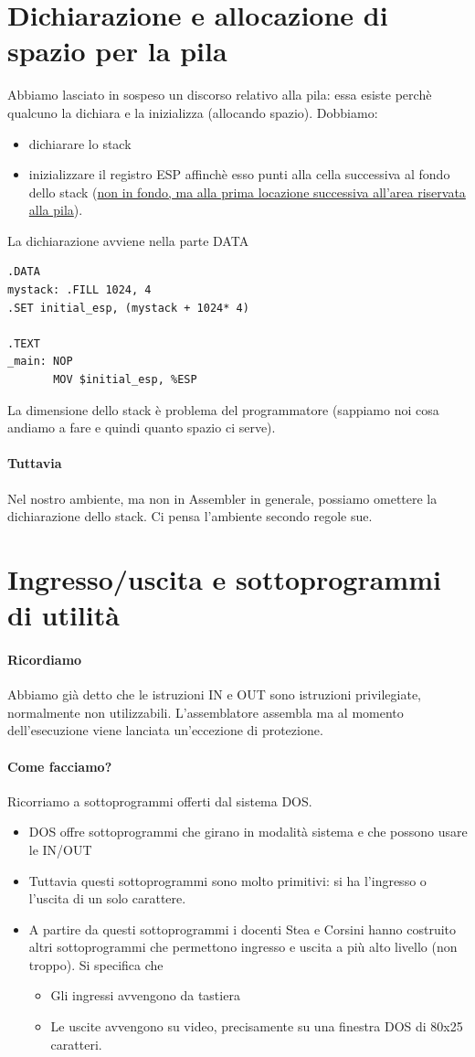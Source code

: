 \documentclass[11pt]{report}
\begin{document}
\section{Dichiarazione e allocazione di spazio per la pila}
Abbiamo lasciato in sospeso un discorso relativo alla pila: essa esiste perchè qualcuno la dichiara e la inizializza (allocando spazio). Dobbiamo:
\begin{itemize}
\item dichiarare lo stack
\item inizializzare il registro ESP affinchè esso punti alla cella successiva al fondo dello stack (\underline{non in fondo, ma alla prima locazione successiva all'area riservata alla pila}). 
\end{itemize}
La dichiarazione avviene nella parte DATA
\begin{verbatim}
.DATA
mystack: .FILL 1024, 4
.SET initial_esp, (mystack + 1024* 4)

.TEXT
_main: NOP
       MOV $initial_esp, %ESP
\end{verbatim}
La dimensione dello stack è problema del programmatore (sappiamo noi cosa andiamo a fare e quindi quanto spazio ci serve).
\paragraph{Tuttavia} Nel nostro ambiente, ma non in Assembler in generale, possiamo omettere la dichiarazione dello stack. Ci pensa l'ambiente secondo regole sue.
\clearpage

\section{Ingresso/uscita e sottoprogrammi di utilità}
\paragraph{Ricordiamo} Abbiamo già detto che le istruzioni IN e OUT sono istruzioni privilegiate, normalmente non utilizzabili. L'assemblatore assembla ma al momento dell'esecuzione viene lanciata un'eccezione di protezione.
\paragraph{Come facciamo?}  Ricorriamo a sottoprogrammi offerti dal sistema DOS.
\begin{itemize}
\item DOS offre sottoprogrammi che girano in modalità sistema e che possono usare le IN/OUT
\item Tuttavia questi sottoprogrammi sono molto primitivi: si ha l'ingresso o l'uscita di un solo carattere.
\item A partire da questi sottoprogrammi i docenti Stea e Corsini hanno costruito altri sottoprogrammi che permettono ingresso e uscita a più alto livello (non troppo). Si specifica che
\begin{itemize}
\item Gli ingressi avvengono da tastiera
\item Le uscite avvengono su video, precisamente su una finestra DOS di 80x25 caratteri.
\end{itemize}
\end{itemize}
\end{document}
